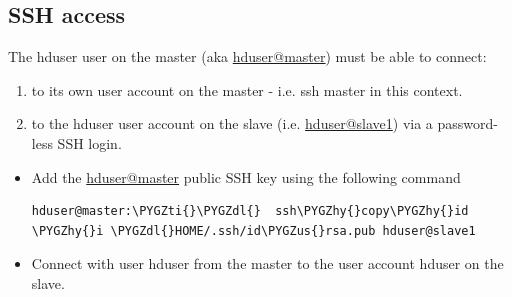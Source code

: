 \documentclass[letterpaper,10pt,english]{sphinxmanual}
\def\PYGZus{\char`\_}
\def\PYGZdl{\char`\$}
\def\PYGZhy{\char`\-}
\def\PYGZti{\char`\~}
\begin{document}
\subsection{SSH access}
\label{hadoop:ssh-access}
The hduser user on the master (aka \href{mailto:hduser@master}{hduser@master}) must be able to connect:
\begin{enumerate}
\item {} 
to its own user account on the master - i.e. ssh master in this context.

\item {} 
to the hduser user account on the slave (i.e. \href{mailto:hduser@slave1}{hduser@slave1}) via a password-less SSH         login.

\end{enumerate}
\begin{itemize}
\item {} 
Add the \href{mailto:hduser@master}{hduser@master} public SSH key using the following command

\begin{Verbatim}[commandchars=\\\{\}]
hduser@master:\PYGZti{}\PYGZdl{}  ssh\PYGZhy{}copy\PYGZhy{}id \PYGZhy{}i \PYGZdl{}HOME/.ssh/id\PYGZus{}rsa.pub hduser@slave1
\end{Verbatim}

\end{itemize}
\begin{figure}[htbp]
\centering

\end{figure}
\begin{itemize}
\item {} 
Connect with user hduser from the master to the user account hduser on the slave.

\end{itemize}
\end{document}
